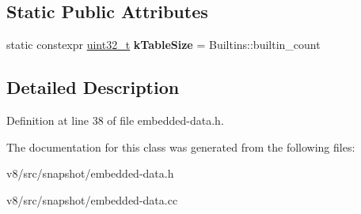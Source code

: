 \subsection*{Static Public Attributes}
\begin{DoxyCompactItemize}
\item 
\mbox{\label{classv8_1_1internal_1_1EmbeddedData_ae732acf2a35dc69cbc2845d35cffd9fb}} 
static constexpr \mbox{\hyperlink{classuint32__t}{uint32\+\_\+t}} {\bfseries k\+Table\+Size} = Builtins\+::builtin\+\_\+count
\end{DoxyCompactItemize}


\subsection{Detailed Description}


Definition at line 38 of file embedded-\/data.\+h.



The documentation for this class was generated from the following files\+:\begin{DoxyCompactItemize}
\item 
v8/src/snapshot/embedded-\/data.\+h\item 
v8/src/snapshot/embedded-\/data.\+cc\end{DoxyCompactItemize}
